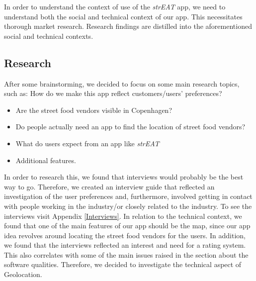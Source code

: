 In order to understand the context of use of the \textit{strEAT} app, we need to understand both the social and technical context of our app. This necessitates thorough market research. Research findings are distilled into the aforementioned social and technical contexts.

\subsection{Research}

After some brainstorming, we decided to focus on some main research topics, such as:
How do we make this app reflect customers/users’ preferences?

\begin{itemize}
\item Are the street food vendors visible in Copenhagen?
\item Do people actually need an app to find the location of street food vendors?
\item What do users expect from an app like \textit{strEAT}
\item Additional features.
\end{itemize}

In order to research this, we found that interviews would probably be the best way to go. Therefore, we created an interview guide that reflected an investigation of the user preferences and, furthermore, involved getting in contact with people working in the industry/or closely related to the industry. To see the interviews visit Appendix \ref{Interviews}.
In relation to the technical context, we found that one of the main features of our app should be the map, since our app idea revolves around locating the street food vendors for the users. In addition, we found that the interviews reflected an interest and need for a rating system. This also correlates with some of the main issues raised in the section about the software qualities. Therefore, we decided to investigate the technical aspect of Geolocation.

